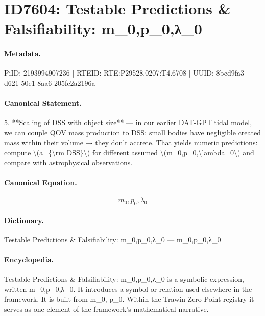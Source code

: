 \section*{ID7604: Testable Predictions \& Falsifiability: m\_0,p\_0,λ\_0}
\paragraph{Metadata.}
PiID: 2193994907236 | RTEID: RTE:P29528.0207:T4.6708 | UUID: 8bcd9fa3-d621-50e1-8aa6-205fc2a2196a

\paragraph{Canonical Statement.}
5. **Scaling of DSS with object size** — in our earlier DAT-GPT tidal model, we can couple QOV mass production to DSS: small bodies have negligible created mass within their volume → they don’t accrete. That yields numeric predictions: compute \textbackslash{}(a\_\{\textbackslash{}rm DSS\}\textbackslash{}) for different assumed \textbackslash{}(m\_0,p\_0,\textbackslash{}lambda\_0\textbackslash{}) and compare with astrophysical observations.

\paragraph{Canonical Equation.}
\[
m_0,p_0,\lambda_0
\]

\paragraph{Dictionary.}
Testable Predictions \& Falsifiability: m\_0,p\_0,λ\_0 — m\_0,p\_0,λ\_0

\paragraph{Encyclopedia.}
Testable Predictions \& Falsifiability: m\_0,p\_0,λ\_0 is a symbolic expression, written m\_0,p\_0,λ\_0. It introduces a symbol or relation used elsewhere in the framework. It is built from m\_0, p\_0. Within the Trawin Zero Point registry it serves as one element of the framework's mathematical narrative.
